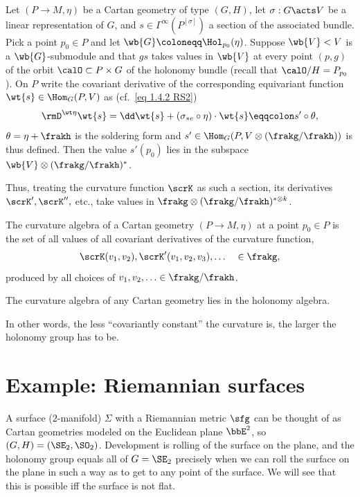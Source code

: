 \begin{lem}\label{lem 16.35 McKay}
    Let $(P\to M,\eta)$ be a Cartan geometry of type $(G,H)$, let $\sigma:G\acts V$ be a linear representation of $G$, and $s\in\varGamma^\infty\left(P^{[\sigma]}\right)$ a section of the associated bundle. Pick a point $p_0\in P$ and let $\wb{G}\coloneqq \Hol_{p_0}(\eta)$. Suppose $\wb{V}<V$ is a $\wb{G}$-submodule and that $gs$ takes values in $\wb{V}$ at every point $(p,g)$ of the orbit $\calO\subset P\times G$ of the holonomy bundle (recall that $\calO\slash H=P_{p_0}$). On $P$ write the covariant derivative of the corresponding equivariant function $\wt{s}\in \Hom_G(P,V)$ as (cf.\ \eqref{eq 1.4.2 RS2})
    \[\rmD^{\wt\eta} \wt{s}=\dd \wt{s}+(\sigma_{\ast e}\circ\eta)\cdot \wt{s}\eqqcolon s'\circ \theta,\]
    $\theta=\eta+\frakh$ is the soldering form and $s'\in \Hom_G(P,V\otimes (\frakg\slash\frakh))$ is thus defined. Then the value $s'(p_0)$ lies in the subspace $\wb{V}\otimes(\frakg\slash\frakh)^\ast$.
\end{lem}

Thus, treating the curvature function $\scrK$ as such a section, its derivatives $\scrK',\scrK'',$ etc., take values in $\frakg\otimes (\frakg\slash \frakh)^{\ast\otimes k}$. 

\begin{defn}
    The curvature algebra of a Cartan geometry $(P\to M,\eta)$ at a point $p_0\in P$ is the set of all values of all covariant derivatives of the curvature function,
    \[\scrK(v_1,v_2),\scrK'(v_1,v_2,v_3),\ldots\quad \in \frakg,\]
    produced by all choices of $v_1,v_2,\ldots \in\frakg\slash\frakh$.    
\end{defn}

\begin{cor}
    The curvature algebra of any Cartan geometry lies in the holonomy algebra.
\end{cor}

In other words, the less ``covariantly constant'' the curvature is, the larger the holonomy group has to be.






\section{Example: Riemannian surfaces}


A surface ($2$-manifold) $\varSigma$ with a Riemannian metric $\sfg$ can be thought of as Cartan geometries modeled on the Euclidean plane $\bbE^2$, so $(G,H)=(\SE_2,\SO_2)$. Development is rolling of the surface on the plane, and the holonomy group equals all of $G=\SE_2$ precisely when we can roll the surface on the plane in such a way as to get to any point of the surface. We will see that this is possible iff the surface is not flat.

